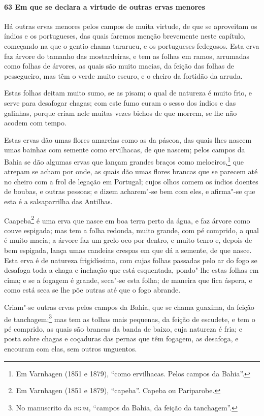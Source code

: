 \paragraph{63 Em que se declara a virtude de outras ervas menores}

Há outras ervas menores pelos campos de muita virtude, de que se aproveitam os índios e os
portugueses, das quais faremos menção brevemente neste capítulo, começando na que o gentio
chama tararucu, e os portugueses fedegosos. Esta erva faz árvore do tamanho das
mostardeiras, e tem as folhas em ramos, arrumadas como folhas de árvores, as quais são
muito macias, da feição das folhas de pessegueiro, mas têm o verde muito escuro, e o
cheiro da fortidão da arruda.

Estas folhas deitam muito sumo, se as pisam; o qual de natureza é muito frio, e serve para
desafogar chagas; com este fumo curam o sesso dos índios e das galinhas, porque criam nele
muitas vezes bichos de que morrem, se lhe não acodem com tempo.

Estas ervas dão umas flores amarelas como as da páscoa, das quais lhes nascem umas bainhas
com semente como ervilhacas, de que nascem; pelos campos da Bahia se dão algumas ervas que
lançam grandes braços como meloeiros,\footnote{ Em Varnhagen (1851 e 1879), ``como
ervilhacas. Pelos campos da Bahia''.} que atrepam se acham por onde, as quais dão umas
flores brancas que se parecem até no cheiro com a frol de legação em Portugal; cujos olhos
comem os índios doentes de boubas, e outras pessoas; e dizem acharem"-se bem com eles, e
afirma"-se que esta é a salsaparrilha das Antilhas.

Caapeba\footnote{ Em Varnhagen (1851 e 1879), ``capeba''. Capeba ou Pariparobe.} é uma
erva que nasce em boa terra perto da água, e faz árvore como couve espigada; mas tem a
folha redonda, muito grande, com pé comprido, a qual é muito macia; a árvore faz um grelo
oco por dentro, e muito tenro e, depois de bem espigada, lança umas candeias crespas em
que dá a semente, de que nasce. Esta erva é de natureza frigidíssima, com cujas folhas
passadas pelo ar do fogo se desafoga toda a chaga e inchação que está esquentada,
pondo"-lhe estas folhas em cima; e se a fogagem é grande, seca"-se esta folha; de maneira
que fica áspera, e como está seca se lhe põe outras até que o fogo abrande.

Criam"-se outras ervas pelos campos da Bahia, que se chama guaxima, da feição de
tanchagem;\footnote{ No manuscrito da \textsc{bgjm}, ``campos da Bahia, da feição da
tanchagem''.} mas tem as tolhas mais pequenas, da feição de escudete, e tem o pé comprido,
as quais são brancas da banda de baixo, cuja natureza é fria; e posta sobre chagas e
coçaduras das pernas que têm fogagem, as desafoga, e encouram com elas, sem outros
unguentos.

